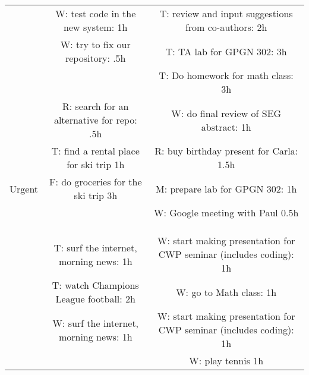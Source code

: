 \documentclass[10pt]{article}
\begin{document}
\begin{landscape} 
\begin{tabular}{c|c|c}
  \hline
             &  W: test code in the new system: 1h          &  T: review and input suggestions from co-authors: 2h        \\
             &  W: try to fix our repository: .5h           &  T: TA lab for GPGN 302: 3h                                 \\
             &                                              &  T: Do homework for math class: 3h                          \\
             &  R: search for an alternative for repo: .5h  &  W: do final review of SEG abstract: 1h                     \\
             &  T: find a rental place for ski trip 1h      &  R: buy birthday present for Carla: 1.5h                    \\
   Urgent    &  F: do groceries for the ski trip 3h           &  M: prepare lab for GPGN 302: 1h                            \\
             &                                              &  W: Google meeting with Paul 0.5h                           \\
             &                                              &                                                             \\
             &                                              &                                                             \\
             &                                              &                                                             \\
  \hline 
             &  T: surf the internet, morning news: 1h      &  W: start making presentation for CWP seminar (includes coding): 1h  \\
             &  T: watch Champions League football: 2h      &  W: go to Math class: 1h                                   \\
             &  W: surf the internet, morning news: 1h      &  W: start making presentation for CWP seminar (includes coding): 1h  \\
             &                                              &  W: play tennis  1h                                        \\


\end{tabular}
\end{landscape}
\end{document}
